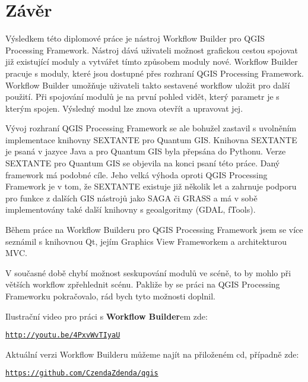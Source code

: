 \chapter*{Závěr}
Výsledkem této diplomové práce je nástroj Workflow Builder pro QGIS Processing Framework. Nástroj dává uživateli možnost  grafickou cestou spojovat již existující moduly a vytvářet tímto způsobem moduly nové. Workflow Builder pracuje s moduly, které jsou dostupné přes rozhraní QGIS Processing Framework. Workflow Builder umožňuje uživateli takto sestavené workflow uložit pro další použití. Při spojování modulů je na první pohled vidět, který parametr je s kterým spojen. Výsledný modul lze znova otevřít a upravovat jej.

Vývoj rozhraní QGIS Processing Framework se ale bohužel zastavil s uvolněním implementace knihovny SEXTANTE pro Quantum GIS. Knihovna SEXTANTE je psaná v jazyce Java a pro Quantum GIS byla přepsána do Pythonu. Verze {SEXTANTE} pro Quantum GIS se objevila na konci psaní této práce. Daný framework má podobné cíle. Jeho velká výhoda oproti QGIS Processing Framework je v tom, že SEXTANTE existuje již několik let a zahrnuje podporu pro funkce z dalších GIS nástrojů jako SAGA či GRASS a má v sobě implementovány také další knihovny s geoalgoritmy (GDAL, fTools).

Během práce na Workflow Builderu pro QGIS Processing Framework jsem se více seznámil s knihovnou Qt, jejím Graphics View Frameworkem a architekturou MVC. 

V současné době chybí možnost seskupování modulů ve scéně, to by mohlo při větších workflow zpřehlednit scénu. Pakliže by se práci na QGIS Processing Frameworku pokračovalo, rád bych tyto možnosti doplnil.

Ilustrační video pro práci s \textbf{Workflow Builder}em zde:

\begin{center}
	\href{http://youtu.be/4PxvWvTIyaU}{\texttt{http://youtu.be/4PxvWvTIyaU}}
\end{center}
 
\newpage
Aktuální verzi Workflow Builderu můžeme najít na přiloženém cd, případně zde:

\begin{center}
	\href{https://github.com/CzendaZdenda/qgis}{\texttt{https://github.com/CzendaZdenda/qgis}}
\end{center}